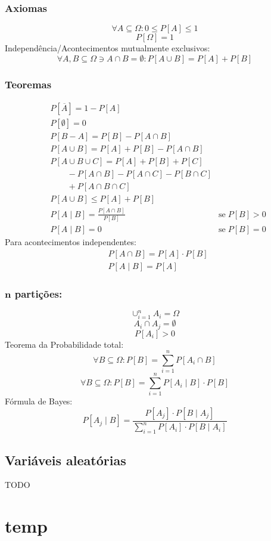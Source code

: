 \documentclass[a4paper]{article}
\begin{document}
\begin{multicols}{3}
\subsubsection{Axiomas}
$$\forall A \subseteq \Omega: 0 \leq P[A] \leq 1$$
$$P[\Omega] = 1$$
Independência/Acontecimentos mutualmente exclusivos:
$$\forall A, B \subseteq \Omega \ni A \cap B = \emptyset: P[A \cup B] = P[A] + P[B]$$
\subsubsection{Teoremas}
\begin{align*}
  &P[\overline{A}] = 1 - P[A] \\
  &P[\emptyset] = 0 \\
  &P[B-A] = P[B] - P[A \cap B] \\
  &P[A \cup B] = P[A] + P[B] - P[A \cap B] \\
  & P[A \cup B \cup C] = P[A] + P[B] + P[C] \\ 
  &\qquad - P[A \cap B] - P[A \cap C] - P[B \cap C] \\ 
  &\qquad + P[A \cap B \cap C] \\
  &P[A \cup B] \leq P[A] + P[B] \\
  &P[A \mid B] = \frac{P[A \cap B]}{P[B]} & \text{se} \; P[B] > 0 \\
  &P[A \mid B] = 0 & \text{se} \; P[B] = 0
\end{align*}
Para acontecimentos independentes:
\begin{align*}
& P[A \cap B] = P[A] \cdot P[B] \\
& P[A \mid B] = P[A]
\end{align*}
\subsubsection{$\mathbold{n}$ partições:} 
$$\cup_{i=1}^n A_i = \Omega$$
$$A_i \cap A_j = \emptyset$$
$$P[A_i] > 0$$
Teorema da Probabilidade total:
$$\forall B \subseteq \Omega: P[B] = \sum_{i=1}^n P[A_i \cap B]$$
$$\forall B \subseteq \Omega: P[B] = \sum_{i=1}^n P[A_i \mid B] \cdot P[B]$$
Fórmula de Bayes:
$$P[A_j \mid B] = \frac{P[A_j] \cdot P[B \mid A_j]}{\sum_{i=1}^n P[A_i] \cdot P[B \mid A_i]}$$
\subsection{Variáveis aleatórias}
TODO















\section{temp}
\blinddocument
\end{multicols}
\end{document}
